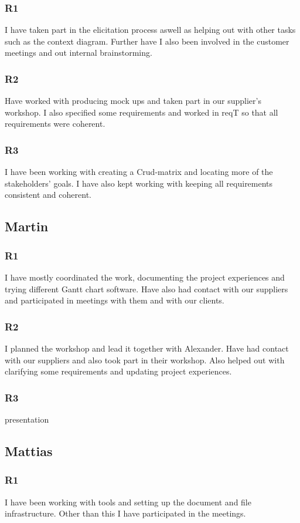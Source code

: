 \documentclass[a4paper]{article}
\begin{document}
		\subsubsection{R1}
		I have taken part in the elicitation process aswell as helping out with other tasks such as the context diagram. Further have I also been involved in the customer meetings and out internal brainstorming.
		\subsubsection{R2}
		Have worked with producing mock ups and taken part in our supplier's workshop. I also specified some requirements and worked in reqT so that all requirements were coherent.
		\subsubsection{R3}
		I have been working with creating a Crud-matrix and locating more of the stakeholders' goals. I have also kept working with keeping all requirements consistent and coherent.
			
	
	\subsection{Martin}
		\subsubsection{R1}
		I have mostly coordinated the work, documenting the project experiences and trying different Gantt chart software. Have also had contact with our suppliers and participated in meetings with them and with our clients.
		\subsubsection{R2}
		I planned the workshop and lead it together with Alexander. Have had contact with our suppliers and also took part in their workshop. Also helped out with clarifying some requirements and updating project experiences.
		\subsubsection{R3}
			presentation
	
	\subsection{Mattias}
		\subsubsection{R1}
		I have been working with tools and setting up the document and file infrastructure. Other than this I have participated in the meetings.
\end{document}
